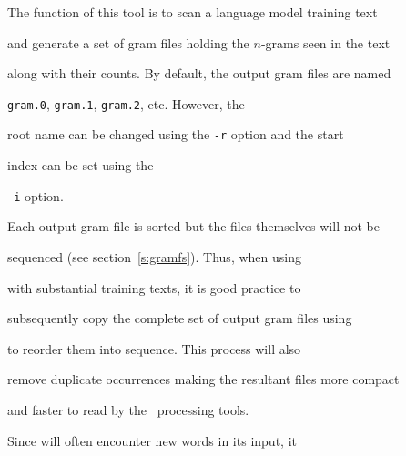 %




%




%





\newpage

















The function of this tool is to scan a language model training text


and generate a set of gram files holding the $n$-grams seen in the text


along with their counts.  By default, the output gram files are named


\texttt{gram.0}, \texttt{gram.1}, \texttt{gram.2}, etc. However, the 


root name can be changed using the \texttt{-r} option and the start


index can be set using the


\texttt{-i} option.  





Each output gram file is sorted but the files themselves will not be


sequenced (see section~\ref{s:gramfs}).  Thus, when using


 with substantial training texts, it is good practice to


subsequently copy the complete set of output gram files using


 to reorder them into sequence. This process will also


remove duplicate occurrences making the resultant files more compact


and faster to read by the \HLM\ processing tools.





Since  will often encounter new words in its input, it


